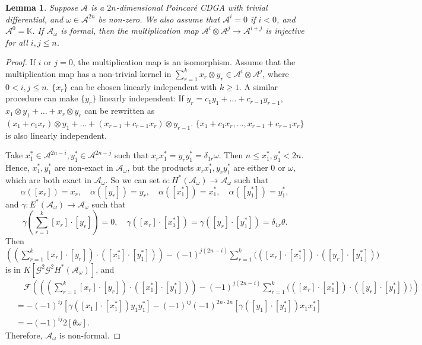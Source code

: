 \documentclass{article}
\theoremstyle{plain}
\newtheorem{lem}[thm]{Lemma}
\theoremstyle{definition}
\theoremstyle{plain}
\numberwithin{equation}{section}
\begin{document}
\begin{lem}
Suppose $\mathcal{A}$ is a $2n$-dimensional Poincar\'e CDGA with trivial differential, and $\omega\in\mathcal{A}^{2n}$ be non-zero. We also assume that $\mathcal{A}^i=0$ if $i<0$, and $\mathcal{A}^0=\mathbb{K}$. If $\mathcal{A}_{\omega}$ is formal, then the multiplication map $\mathcal{A}^i\otimes\mathcal{A}^j\to\mathcal{A}^{i+j}$ is injective for all $i,j\leq n$.
\end{lem}
\begin{proof}
If $i$ or $j=0$, the multiplication map is an isomorphism. Assume that the multiplication map has a non-trivial kernel in $\sum_{r=1}^k x_r\otimes y_r\in\mathcal{A}^i\otimes\mathcal{A}^j$, where $0<i,j\leq n$. $\{ x_r \}$ can be chosen linearly independent with $k\geq 1$. A similar procedure can make $\{ y_r \}$ linearly independent: If $y_r=c_1y_1+\ldots +c_{r-1}y_{r-1}$, $x_1\otimes y_1+\ldots+x_r\otimes y_r$ can be rewritten as $(x_1+c_1x_r)\otimes y_1+\ldots+(x_{r-1}+c_{r-1}x_r)\otimes y_{r-1}$. $\{ x_1+c_1x_r,\ldots,x_{r-1}+c_{r-1}x_r \}$ is also linearly independent.

Take $x_1^*\in\mathcal{A}^{2n-i},y_1^*\in\mathcal{A}^{2n-j}$ such that $x_rx_1^*=y_ry_1^*=\delta_{1r}\omega$. Then $n\leq x_1^*,y_1^*<2n$. Hence, $x_1^*,y_1^*$ are non-exact in $\mathcal{A}_{\omega}$, but the products $x_rx_1^*,y_ry_1^*$ are either 0 or $\omega$, which are both exact in $\mathcal{A}_{\omega}$. So we can set $\alpha:H^*(\mathcal{A}_{\omega})\to\mathcal{A}_{\omega}$ such that
$$
\alpha([x_r])=x_r, \quad \alpha([y_r])=y_r, \quad \alpha([x_1^*])=x_1^*, \quad \alpha([y_1^*])=y_1^*,
$$
and $\gamma:E^*(\mathcal{A}_{\omega})\to\mathcal{A}_{\omega}$ such that
$$
\gamma\left(\sum_{r=1}^k[x_r]\cdot[y_r]\right)=0, \quad \gamma([x_r]\cdot[x_1^*])=\gamma([y_r]\cdot[y_1^*])=\delta_{1r}\theta.
$$
Then $\left( (\sum_{r=1}^k[x_r]\cdot[y_r])\cdot ([x_1^*]\cdot[y_1^*]) \right)-(-1)^{j(2n-i)}\sum_{r=1}^k \Big( ([x_r]\cdot[x_1^*])\cdot ([y_r]\cdot[y_1^*]) \Big)$ is in $K[\mathcal{G}^2\mathcal{G}^2 H^*(\mathcal{A}_{\omega})]$, and
\begin{align*}
& \quad \mathcal{F}\left( \left( (\sum_{r=1}^k[x_r]\cdot[y_r])\cdot ([x_1^*]\cdot[y_1^*]) \right)-(-1)^{j(2n-i)}\sum_{r=1}^k \Big( ([x_r]\cdot[x_1^*])\cdot ([y_r]\cdot[y_1^*]) \Big) \right) \\
&= -(-1)^{ij}[\gamma ([x_1]\cdot[x_1^*])y_1y_1^*]-(-1)^{ij}(-1)^{2n\cdot 2n}[\gamma ([y_1]\cdot[y_1^*])x_1x_1^*] \\
&= -(-1)^{ij}2[\theta\omega].
\end{align*}
Therefore, $\mathcal{A}_{\omega}$ is non-formal.
\end{proof}
\end{document}
